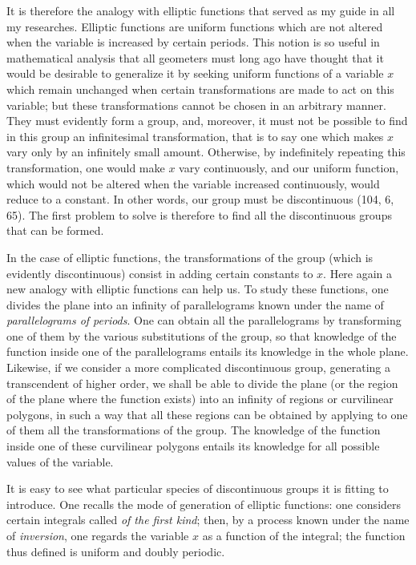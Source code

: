 \documentclass[11pt]{article}
\begin{document}
It is therefore the analogy with elliptic functions that served as my guide in all my researches. Elliptic functions are uniform functions which are not altered when the variable is increased by certain periods. This notion is so useful in mathematical analysis that all geometers must long ago have thought that it would be desirable to generalize it by seeking uniform functions of a variable $x$ which remain unchanged when certain transformations are made to act on this variable; but these transformations cannot be chosen in an arbitrary manner. They must evidently form a group, and, moreover, it must not be possible to find in this group an infinitesimal transformation, that is to say one which makes $x$ vary only by an infinitely small amount. Otherwise, by indefinitely repeating this transformation, one would make $x$ vary continuously, and our uniform function, which would not be altered when the variable increased continuously, would reduce to a constant. In other words, our group must be discontinuous (104, 6, 65). The first problem to solve is therefore to find all the discontinuous groups that can be formed.

In the case of elliptic functions, the transformations of the group (which is evidently discontinuous) consist in adding certain constants to $x$. Here again a new analogy with elliptic functions can help us. To study these functions, one divides the plane into an infinity of parallelograms known under the name of \emph{parallelograms of periods}. One can obtain all the parallelograms by transforming one of them by the various substitutions of the group, so that knowledge of the function inside one of the parallelograms entails its knowledge in the whole plane. Likewise, if we consider a more complicated discontinuous group, generating a transcendent of higher order, we shall be able to divide the plane (or the region of the plane where the function exists) into an infinity of regions or curvilinear polygons, in such a way that all these regions can be obtained by applying to one of them all the transformations of the group. The knowledge of the function inside one of these curvilinear polygons entails its knowledge for all possible values of the variable.

It is easy to see what particular species of discontinuous groups it is fitting to introduce. One recalls the mode of generation of elliptic functions: one considers certain integrals called \emph{of the first kind}; then, by a process known under the name of \emph{inversion}, one regards the variable $x$ as a function of the integral; the function thus defined is uniform and doubly periodic.
\end{document}
